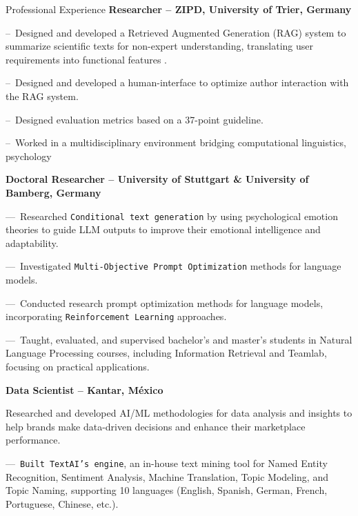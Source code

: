 \begin{rubric}{Professional Experience}
\entry*[02.2025 -- Present]%
\textbf{Researcher -- ZIPD, University of Trier, Germany}

--~Designed and developed a Retrieved Augmented Generation (RAG) system to summarize scientific texts for non-expert understanding, translating user requirements into functional features .\par\par
--~Designed and developed a human-interface to optimize author interaction with the RAG system.\par\par
--~Designed evaluation metrics based on a 37-point guideline.\par\par
--~Worked in a multidisciplinary environment bridging computational linguistics, psychology\par\par

\entry*[04.2022 -- 01.2025]%
	\textbf{Doctoral Researcher -- University of Stuttgart \& University of Bamberg, Germany}
	
---~Researched \texttt{Conditional text generation} by using psychological emotion theories to guide LLM outputs to improve their emotional intelligence and adaptability.\par\par

 ---~Investigated \texttt{Multi-Objective Prompt Optimization} methods for language models.\par\par

 ---~Conducted research prompt optimization methods for language models, incorporating \texttt{Reinforcement Learning} approaches.\par\par
 
---~Taught, evaluated, and supervised bachelor's and master's students in Natural Language Processing courses, including Information Retrieval and Teamlab, focusing on practical applications.\par\par

\entry*[06.2018 -- 09.2021]%
	\textbf{Data Scientist -- Kantar, México}
 
Researched and developed AI/ML methodologies for data analysis and insights to help brands make data-driven decisions and enhance their marketplace performance.\par\par
%
---~\texttt{Built TextAI’s engine}, an in-house text mining tool for Named Entity Recognition, Sentiment Analysis, Machine Translation, Topic Modeling, and Topic Naming, supporting 10 languages (English, Spanish, German, French, Portuguese, Chinese, etc.).\par


\end{rubric}
